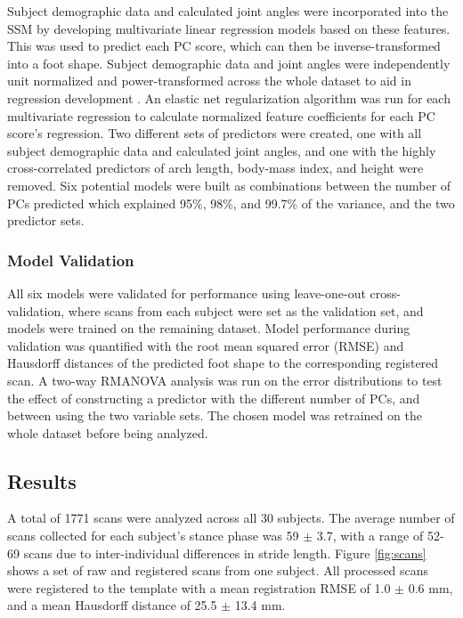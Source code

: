\documentclass[defaultstyle,11pt]{thesis}
\begin{document}
Subject demographic data and calculated joint angles were incorporated into the SSM by developing multivariate linear regression models based on these features.
This was used to predict each PC score, which can then be inverse-transformed into a foot shape.
Subject demographic data and joint angles were independently unit normalized and power-transformed across the whole dataset to aid in regression development \citep{Yeo2000}.
An elastic net regularization algorithm \citep{Zou2005} was run for each multivariate regression to calculate normalized feature coefficients for each PC score's regression.
Two different sets of predictors were created, one with all subject demographic data and calculated joint angles, and one with the highly cross-correlated predictors of arch length, body-mass index, and height were removed.
Six potential models were built as combinations between the number of PCs predicted which explained 95\%, 98\%, and 99.7\% of the variance, and the two predictor sets.

\hypertarget{model-validation}{%
\subsubsection{Model Validation}\label{model-validation}}

All six models were validated for performance using leave-one-out cross-validation, where scans from each subject were set as the validation set, and models were trained on the remaining dataset.
Model performance during validation was quantified with the root mean squared error (RMSE) and Hausdorff distances of the predicted foot shape to the corresponding registered scan.
A two-way RMANOVA analysis was run on the error distributions to test the effect of constructing a predictor with the different number of PCs, and between using the two variable sets.
The chosen model was retrained on the whole dataset before being analyzed.

\hypertarget{results-1}{%
\subsection{Results}\label{results-1}}

A total of 1771 scans were analyzed across all 30 subjects.
The average number of scans collected for each subject's stance phase was 59 \(\pm\) 3.7, with a range of 52-69 scans due to inter-individual differences in stride length.
Figure \ref{fig:scans} shows a set of raw and registered scans from one subject.
All processed scans were registered to the template with a mean registration RMSE of 1.0 \(\pm\) 0.6 mm, and a mean Hausdorff distance of 25.5 \(\pm\) 13.4 mm.
\end{document}
